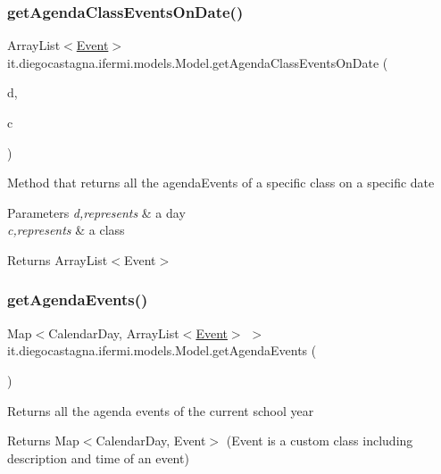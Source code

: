 \subsubsection{\texorpdfstring{getAgendaClassEventsOnDate()}{getAgendaClassEventsOnDate()}}
{\footnotesize\ttfamily Array\+List$<$\mbox{\hyperlink{classit_1_1diegocastagna_1_1ifermi_1_1utils_1_1_event}{Event}}$>$ it.\+diegocastagna.\+ifermi.\+models.\+Model.\+get\+Agenda\+Class\+Events\+On\+Date (\begin{DoxyParamCaption}\item[{Calendar\+Day}]{d,  }\item[{String}]{c }\end{DoxyParamCaption})\hspace{0.3cm}{\ttfamily [inline]}}

Method that returns all the agenda\+Events of a specific class on a specific date 
\begin{DoxyParams}{Parameters}
{\em d,represents} & a day \\
\hline
{\em c,represents} & a class \\
\hline
\end{DoxyParams}
\begin{DoxyReturn}{Returns}
Array\+List$<$\+Event$>$ 
\end{DoxyReturn}
\mbox{\label{classit_1_1diegocastagna_1_1ifermi_1_1models_1_1_model_afe878be51289990d656e7c12fd07962c}} 
\subsubsection{\texorpdfstring{getAgendaEvents()}{getAgendaEvents()}}
{\footnotesize\ttfamily Map$<$Calendar\+Day, Array\+List$<$\mbox{\hyperlink{classit_1_1diegocastagna_1_1ifermi_1_1utils_1_1_event}{Event}}$>$ $>$ it.\+diegocastagna.\+ifermi.\+models.\+Model.\+get\+Agenda\+Events (\begin{DoxyParamCaption}{ }\end{DoxyParamCaption})\hspace{0.3cm}{\ttfamily [inline]}}

Returns all the agenda events of the current school year \begin{DoxyReturn}{Returns}
Map$<$\+Calendar\+Day, Event$>$ (Event is a custom class including description and time of an event) 
\end{DoxyReturn}
\mbox{\label{classit_1_1diegocastagna_1_1ifermi_1_1models_1_1_model_a70601163ab1b677f034aae7e608a9679}} 
